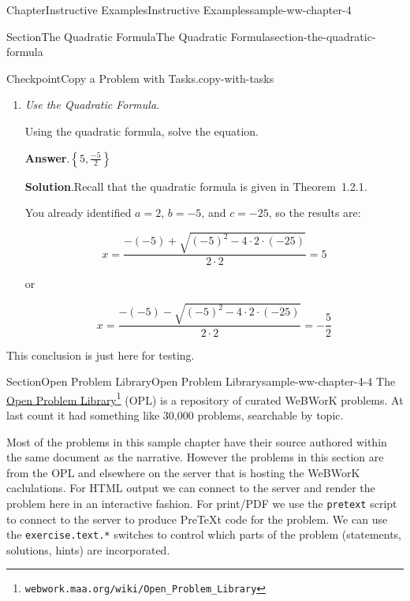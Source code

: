 \documentclass[oneside,10pt,]{book}
\newcommand{\blocktitlefont}{\relax}
\newcommand{\mono}[1]{\texttt{#1}}
\newcommand{\lititle}[1]{{\slshape#1}}
\numberwithin{equation}{section}
\begin{document}
\begin{chapterptx}{Chapter}{Instructive Examples}{}{Instructive Examples}{}{}{sample-ww-chapter-4}
\begin{sectionptx}{Section}{The Quadratic Formula}{}{The Quadratic Formula}{}{}{section-the-quadratic-formula}
\begin{inlineexercise}{Checkpoint}{Copy a Problem with Tasks.}{copy-with-tasks}
\begin{enumerate}[font=\bfseries,label=(\alph*),ref=\alph*]
\item{}\lititle{Use the Quadratic Formula.}\par%
Using the quadratic formula, solve the equation.%
\par\smallskip%
\noindent\textbf{\blocktitlefont Answer}.\hypertarget{copy-with-tasks-4-3}{}\quad{}\(\left\{5,\frac{-5}{2}\right\}\)%
\par\smallskip%
\noindent\textbf{\blocktitlefont Solution}.\hypertarget{copy-with-tasks-4-4}{}\quad{}Recall that the quadratic formula is given in Theorem~1.2.1.%
\par
You already identified \(a = {2}\text{,}\) \(b = {-5}\text{,}\) and \(c = {-25}\text{,}\) so the results are:%
\par
%
\begin{equation*}
x = {\frac{-\left(-5\right)+\sqrt{\left(-5\right)^{2}-4\cdot 2\cdot \left(-25\right)}}{2\cdot 2}} = {5}
\end{equation*}
%
\par
or%
\par
%
\begin{equation*}
x = {\frac{-\left(-5\right)-\sqrt{\left(-5\right)^{2}-4\cdot 2\cdot \left(-25\right)}}{2\cdot 2}} = {-{\frac{5}{2}}}
\end{equation*}
%
\end{enumerate}%
This conclusion is just here for testing.%
\end{inlineexercise}%
\end{sectionptx}
%
%
\typeout{************************************************}
\typeout{************************************************}
%
\begin{sectionptx}{Section}{Open Problem Library}{}{Open Problem Library}{}{}{sample-ww-chapter-4-4}
The \href{http://webwork.maa.org/wiki/Open_Problem_Library}{Open Problem Library}\footnote{\nolinkurl{webwork.maa.org/wiki/Open_Problem_Library}\label{sample-ww-chapter-4-4-2-2}} (OPL) is a repository of curated WeBWorK problems. At last count it had something like 30,000 problems, searchable by topic.%
\par
Most of the problems in this sample chapter have their source authored within the same document as the narrative.  However the problems in this section are from the OPL and elsewhere on the server that is hosting the WeBWorK caclulations.  For HTML output we can connect to the server and render the problem here in an interactive fashion.  For print\slash{}PDF we use the \mono{pretext} script to connect to the server to produce PreTeXt code for the problem.  We can use the \mono{exercise.text.*} switches to control which parts of the problem (statements, solutions, hints) are incorporated.%

\end{sectionptx}
\end{chapterptx}
\end{document}
